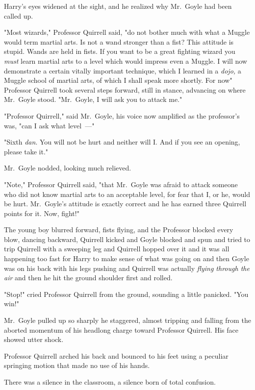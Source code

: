 Harry's eyes widened at the sight, and he realized why Mr.~Goyle had been
called up.

"Most wizards," Professor Quirrell said, "do not bother much with what a Muggle
would term martial arts. Is not a wand stronger than a fist? This attitude is
stupid. Wands are held in fists. If you want to be a great fighting wizard you
\emph{must} learn martial arts to a level which would impress even a Muggle. I
will now demonstrate a certain vitally important technique, which I learned in
a \emph{dojo,} a Muggle school of martial arts, of which I shall speak more
shortly. For now{\el}" Professor Quirrell took several steps forward, still
in stance, advancing on where Mr.~Goyle stood. "Mr.~Goyle, I will ask you to
attack me."

"Professor Quirrell," said Mr.~Goyle, his voice now amplified as the
professor's was, "can I ask what level~---"

"Sixth \emph{dan}. You will not be hurt and neither will I. And if you see an
opening, please take it."

Mr.~Goyle nodded, looking much relieved.

"Note," Professor Quirrell said, "that Mr.~Goyle was afraid to attack someone
who did not know martial arts to an acceptable level, for fear that I, or he,
would be hurt. Mr.~Goyle's attitude is exactly correct and he has earned three
Quirrell points for it. Now, fight!"

The young boy blurred forward, fists flying, and the Professor blocked every
blow, dancing backward, Quirrell kicked and Goyle blocked and spun and tried to
trip Quirrell with a sweeping leg and Quirrell hopped over it and it was all
happening too fast for Harry to make sense of what was going on and then Goyle
was on his back with his legs pushing and Quirrell was actually \emph{flying
through the air} and then he hit the ground shoulder first and rolled.

"Stop!" cried Professor Quirrell from the ground, sounding a little panicked.
"You win!"

Mr.~Goyle pulled up so sharply he staggered, almost tripping and falling from
the aborted momentum of his headlong charge toward Professor Quirrell. His face
showed utter shock.

Professor Quirrell arched his back and bounced to his feet using a peculiar
springing motion that made no use of his hands.

There was a silence in the classroom, a silence born of total confusion.

